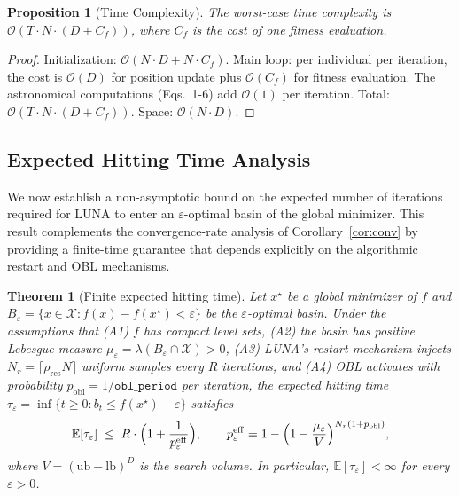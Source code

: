 \documentclass[review]{elsarticle}
\newtheorem{theorem}{Theorem}
\newtheorem{proposition}{Proposition}
\theoremstyle{definition}
\begin{document}
\begin{proposition}[Time Complexity]
\label{prop:complexity}
The worst-case time complexity is $\mathcal{O}(T \cdot N \cdot (D + C_f))$, where $C_f$ is the cost of one fitness evaluation.
\end{proposition}
\begin{proof}
Initialization: $\mathcal{O}(N \cdot D + N \cdot C_f)$. Main loop: per individual per iteration, the cost is $\mathcal{O}(D)$ for position update plus $\mathcal{O}(C_f)$ for fitness evaluation. The astronomical computations (Eqs.\ 1-6) add $\mathcal{O}(1)$ per iteration. Total: $\mathcal{O}(T \cdot N \cdot (D + C_f))$. Space: $\mathcal{O}(N \cdot D)$.
\end{proof}

\subsection{Expected Hitting Time Analysis}
\label{sec:hitting-time}

We now establish a non-asymptotic bound on the expected number of iterations required for LUNA to enter an $\varepsilon$-optimal basin of the global minimizer. This result complements the convergence-rate analysis of Corollary~\ref{cor:conv} by providing a finite-time guarantee that depends explicitly on the algorithmic restart and OBL mechanisms.

\begin{theorem}[Finite expected hitting time]
\label{thm:hitting}
Let $x^\star$ be a global minimizer of $f$ and $B_\varepsilon=\{x\in\mathcal{X}:f(x)-f(x^\star)<\varepsilon\}$ be the $\varepsilon$-optimal basin. Under the assumptions that (A1) $f$ has compact level sets, (A2) the basin has positive Lebesgue measure $\mu_\varepsilon=\lambda(B_\varepsilon\cap\mathcal{X})>0$, (A3) LUNA's restart mechanism injects $N_r=\lceil\rho_{\mathrm{res}}N\rceil$ uniform samples every $R$ iterations, and (A4) OBL activates with probability $p_{\mathrm{obl}}=1/\texttt{obl\_period}$ per iteration, the expected hitting time $\tau_\varepsilon=\inf\{t\ge 0:b_t\le f(x^\star)+\varepsilon\}$ satisfies
\[
\mathbb{E}[\tau_\varepsilon]\;\le\;R\cdot\Bigl(1+\frac{1}{p_\varepsilon^{\mathrm{eff}}}\Bigr),\qquad
p_\varepsilon^{\mathrm{eff}}=1-\Bigl(1-\frac{\mu_\varepsilon}{V}\Bigr)^{N_r(1+p_{\mathrm{obl}})},
\]
where $V=(\mathrm{ub}-\mathrm{lb})^D$ is the search volume. In particular, $\mathbb{E}[\tau_\varepsilon]<\infty$ for every $\varepsilon>0$.
\end{theorem}
\end{document}
